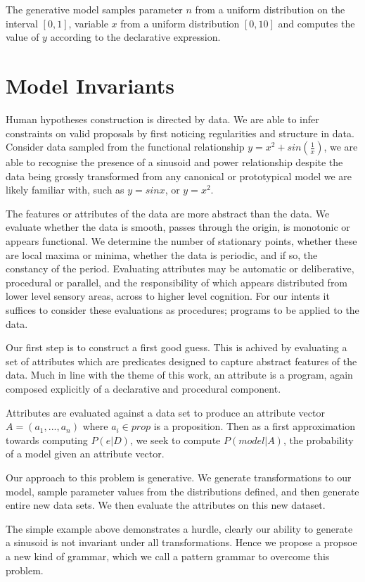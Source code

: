 The generative model samples parameter $n$ from a uniform distribution on the interval $[0, 1]$, variable $x$ from a uniform distribution $[0, 10]$ and computes the value of $y$ according to the declarative expression.

\section{Model Invariants}
Human hypotheses construction is directed by data.
We are able to infer constraints on valid proposals by first noticing regularities and structure in data.
Consider data sampled from the functional relationship $y=x^2+sin(\frac{1}{x})$, we are able to recognise the presence of a sinusoid and power relationship despite the data being grossly transformed from any canonical or prototypical model we are likely familiar with, such as $y=sinx$, or $y=x^2$.

The features or attributes of the data are more abstract than the data.
We evaluate whether the data is smooth, passes through the origin, is monotonic or appears functional.
We determine the number of stationary points, whether these are local maxima or minima, whether the data is periodic, and if so, the constancy of the period.
Evaluating attributes may be automatic or deliberative, procedural or parallel, and the responsibility of which appears distributed from lower level sensory areas, across to higher level cognition.
For our intents it suffices to consider these evaluations as procedures; programs to be applied to the data.

Our first step is to construct a first good guess.
This is achived by evaluating a set of attributes which are predicates designed to capture abstract features of the data.
Much in line with the theme of this work, an attribute is a program, again composed explicitly of a declarative and procedural component.

Attributes are evaluated against a data set to produce an attribute vector $A = (a_1,...,a_n)$ where $a_i \in prop$ is a proposition.
Then as a first approximation towards computing $P(e | D)$, we seek to compute $P(model | A)$, the probability of a model given an attribute vector.

Our approach to this problem is generative.
We generate transformations to our model, sample parameter values from the distributions defined, and then generate entire new data sets.
We then evaluate the attributes on this new dataset.

The simple example above demonstrates a hurdle, clearly our ability to generate a sinusoid is not invariant under all transformations.
Hence we propose a propsoe a new kind of grammar, which we call a pattern grammar to overcome this problem.

